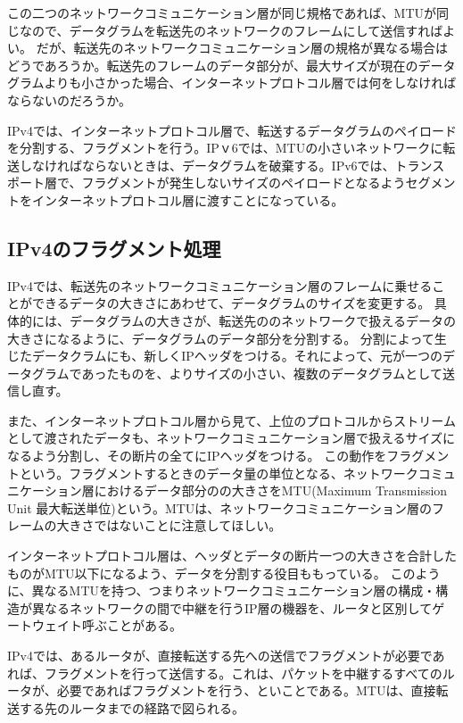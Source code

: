 この二つのネットワークコミュニケーション層が同じ規格であれば、MTUが同じなので、データグラムを転送先のネットワークのフレームにして送信すればよい。
だが、転送先のネットワークコミュニケーション層の規格が異なる場合はどうであろうか。転送先のフレームのデータ部分が、最大サイズが現在のデータグラムよりも小さかった場合、インターネットプロトコル層では何をしなければならないのだろうか。

IPv4では、インターネットプロトコル層で、転送するデータグラムのペイロードを分割する、フラグメントを行う。IPｖ6では、MTUの小さいネットワークに転送しなければならないときは、データグラムを破棄する。IPv6では、トランスポート層で、フラグメントが発生しないサイズのペイロードとなるようセグメントをインターネットプロトコル層に渡すことになっている。


\subsection{IPv4のフラグメント処理}

IPv4では、転送先のネットワークコミュニケーション層のフレームに乗せることができるデータの大きさにあわせて、データグラムのサイズを変更する。
具体的には、データグラムの大きさが、転送先ののネットワークで扱えるデータの大きさになるように、データグラムのデータ部分を分割する。
分割によって生じたデータクラムにも、新しくIPヘッダをつける。それによって、元が一つのデータグラムであったものを、よりサイズの小さい、複数のデータグラムとして送信し直す。

また、インターネットプロトコル層から見て、上位のプロトコルからストリームとして渡されたデータも、ネットワークコミュニケーション層で扱えるサイズになるよう分割し、その断片の全てにIPヘッダをつける。
この動作をフラグメントという。フラグメントするときのデータ量の単位となる、ネットワークコミュニケーション層におけるデータ部分のの大きさをMTU(Maximum Transmission Unit 最大転送単位)という。MTUは、ネットワークコミュニケーション層のフレームの大きさではないことに注意してほしい。

インターネットプロトコル層は、ヘッダとデータの断片一つの大きさを合計したものがMTU以下になるよう、データを分割する役目ももっている。
このように、異なるMTUを持つ、つまりネットワークコミュニケーション層の構成・構造が異なるネットワークの間で中継を行うIP層の機器を、ルータと区別してゲートウェイト呼ぶことがある。

IPv4では、あるルータが、直接転送する先への送信でフラグメントが必要であれば、フラグメントを行って送信する。これは、パケットを中継するすべてのルータが、必要であればフラグメントを行う、といことである。MTUは、直接転送する先のルータまでの経路で図られる。



